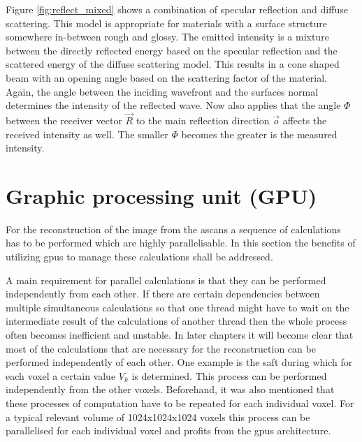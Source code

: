 

Figure \ref{fig:reflect_mixed} shows a combination of specular reflection and diffuse scattering. This model is appropriate for materials with a surface structure somewhere in-between rough and glossy. The emitted intensity is a mixture between the directly reflected energy based on the specular reflection and the scattered energy of the diffuse scattering model. This results in a cone shaped beam with an opening angle based on the scattering factor of the material. Again, the angle between the inciding wavefront and the surfaces normal determines the intensity of the reflected wave. Now also applies that the angle $\Phi$  between the receiver vector $\overrightarrow{R}$ to the main reflection direction $\overrightarrow{o}$ affects the received intensity as well. The smaller $\Phi$ becomes the greater is the measured intensity.








\section{Graphic processing unit (GPU)}

For the reconstruction of the image from the \acp{ascan} a sequence of calculations has to be performed which are highly parallelisable. In this section the benefits of utilizing \acp{gpu} to manage these calculations shall be addressed.

A main requirement for parallel calculations is that they can be performed independently from each other.
If there are certain dependencies between multiple simultaneous calculations so that one thread might have to wait on the intermediate result of the calculations of another thread then the whole process often becomes inefficient and unstable. 
In later chapters it will become clear that most of the calculations that are necessary for the reconstruction can be performed independently of each other. One example is the \ac{saft} during which for each voxel a certain value $V_k$ is determined. This process can be performed independently from the other voxels.
Beforehand, it was also mentioned that these processes of computation have to be repeated for each individual voxel. For a typical relevant volume of 1024x1024x1024 voxels this process can be parallelised for each individual voxel and profits from the \ac{gpu}s architecture. 

